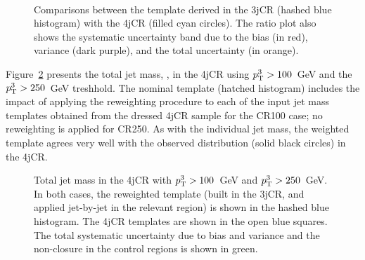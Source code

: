 \begin{figure}[!ht]
  \centering
  
  \\
    
  \caption{Comparisons between the template derived in the 3jCR (hashed blue histogram) with the 4jCR (filled cyan circles). The ratio plot also shows the systematic uncertainty band due to the bias (in red), variance (dark purple), and the total uncertainty (in orange).}
           
  \label{fig:search:search:4jcr:Jets}
\end{figure}
%


Figure~\ref{fig:search:search:4jcr:Total} presents the total jet mass, \MJ, in the 4jCR using $p_{\text{T}}^{3}>100$~GeV and the $p_{\text{T}}^{3} > 250$~GeV treshhold. The nominal template (hatched histogram) includes the impact of applying the reweighting procedure to each of the input jet mass templates obtained from the dressed 4jCR sample for the CR100 case; no reweighting is applied for CR250. As with the individual jet mass, the weighted template agrees very well with the observed \MJ distribution (solid black circles) in the 4jCR.
%
\begin{figure}[!ht]
  \centering
  \caption{Total jet mass in the 4jCR with $p_{\text{T}}^{3}>100$~GeV and $p_{\text{T}}^{3} > 250$~GeV. In both cases, the reweighted template (built in the 3jCR, and applied jet-by-jet in the relevant region) is shown in the hashed blue histogram. The 4jCR templates are shown in the open blue squares. The total systematic uncertainty due to bias and variance and the non-closure in the control regions is shown in green.}
  \label{fig:search:search:4jcr:Total}
\end{figure}
%

